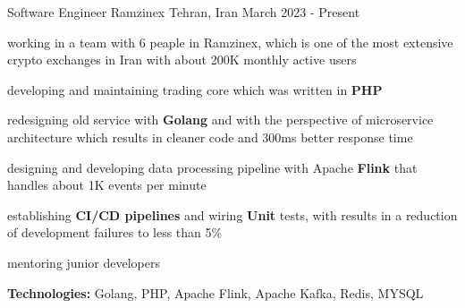 

\begin{cventries}

  \cventry
    {Software Engineer} %
    {Ramzinex} %
    {Tehran, Iran} %
    {March 2023 - Present} %
    {
      \begin{cvitems} %
        \item working in a team with 6 peaple in Ramzinex, which is one of the most extensive crypto exchanges in Iran with about 200K monthly active users
        \item developing and maintaining trading core which was written in \textbf{PHP}
        \item redesigning old service with \textbf{Golang} and with the perspective of microservice architecture which results in cleaner code and 300ms better response time
        \item designing and developing data processing pipeline with Apache \textbf{Flink} that handles about 1K events per minute
        \item establishing \textbf{CI/CD pipelines} and wiring \textbf{Unit} tests, with results in a reduction of development failures to less than 5\%
        \item mentoring junior developers
        \item \textbf{Technologies:} Golang, PHP, Apache Flink, Apache Kafka, Redis, MYSQL
      \end{cvitems}
    }


\end{cventries}
